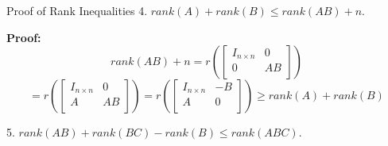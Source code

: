 \documentclass{beamer}
\begin{document}
\begin{frame}{Proof of Rank Inequalities}
4. $rank(A)+rank(B)\leqslant rank(AB)+n$.

\vspace{5pt}
\textbf{Proof:}
\begin{equation*}
    rank\left( AB \right) +n=r\left( \left[ \begin{matrix}
        I_{n\times n}&		0\\
        0&		AB\\
    \end{matrix} \right] \right)
\end{equation*}
\begin{equation*}
    =r\left( \left[ \begin{matrix}
        I_{n\times n}&		0\\
        A&		AB\\
    \end{matrix} \right] \right) =r\left( \left[ \begin{matrix}
        I_{n\times n}&		-B\\
        A&		0\\
    \end{matrix} \right] \right) \geqslant rank\left( A \right) +rank\left( B \right)
\end{equation*}

\vspace{3pt}
5. $rank(AB)+rank(BC)-rank(B)\leqslant rank(ABC)$.


\end{frame}
\end{document}
